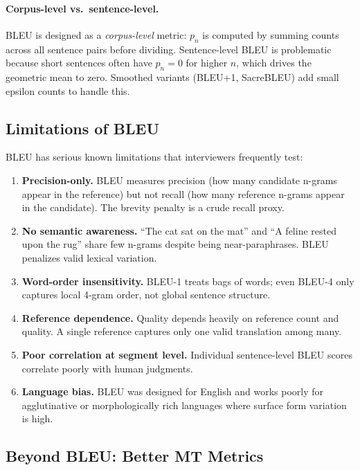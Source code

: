 \paragraph{Corpus-level vs.\ sentence-level.}
BLEU is designed as a \emph{corpus-level} metric: $p_n$ is computed by summing
counts across all sentence pairs before dividing.  Sentence-level BLEU is
problematic because short sentences often have $p_n = 0$ for higher $n$, which
drives the geometric mean to zero.  Smoothed variants (BLEU+1, SacreBLEU) add
small epsilon counts to handle this.

\subsection{Limitations of BLEU}

\begin{warningbox}
BLEU has serious known limitations that interviewers frequently test:
\begin{enumerate}[label=(\arabic*)]
    \item \textbf{Precision-only.}  BLEU measures precision (how many candidate
          n-grams appear in the reference) but not recall (how many reference
          n-grams appear in the candidate).  The brevity penalty is a crude
          recall proxy.
    \item \textbf{No semantic awareness.}  ``The cat sat on the mat'' and
          ``A feline rested upon the rug'' share few n-grams despite being
          near-paraphrases.  BLEU penalizes valid lexical variation.
    \item \textbf{Word-order insensitivity.}  BLEU-1 treats bags of words; even
          BLEU-4 only captures local 4-gram order, not global sentence structure.
    \item \textbf{Reference dependence.}  Quality depends heavily on reference
          count and quality.  A single reference captures only one valid
          translation among many.
    \item \textbf{Poor correlation at segment level.}  Individual sentence-level
          BLEU scores correlate poorly with human judgments.
    \item \textbf{Language bias.}  BLEU was designed for English and works poorly
          for agglutinative or morphologically rich languages where surface form
          variation is high.
\end{enumerate}
\end{warningbox}

\subsection{Beyond BLEU: Better MT Metrics}

